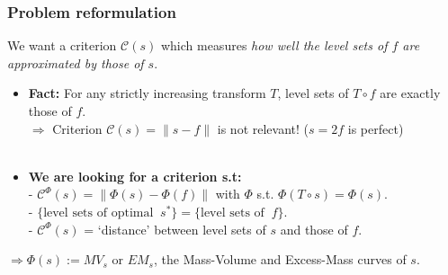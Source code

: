 \documentclass[10pt]{beamer}
\newcommand{\crit}{\mathcal{C}}
\def\leb{\text{Leb}}
\begin{document}
\begin{frame}
\frametitle{Problem reformulation}
We want a criterion $\mathcal{C}(s)$ which measures \emph{how well the level sets of $f$ are approximated by those of $s$}.
\begin{block}{}
\begin{itemize}
\item \textbf{Fact:} For any strictly increasing transform $T$, level sets of $T \circ f$ are exactly those of $f$.\\
$\Rightarrow$ Criterion $\mathcal{C}(s) = \|s-f\|$ is not relevant! ($s = 2f$ is perfect)\\~\\

\item \textbf{We are looking for a criterion s.t:}\\
- $\crit^{\Phi}(s) = \| \Phi(s) - \Phi(f) \|$ with $\Phi$ s.t. $\Phi(T \circ s) = \Phi(s)$. \\
- $ \{ \text{level sets of optimal }~ s^*\} = \{ \text{level sets of } ~f \}$. \\
- $\crit^{\Phi}(s)$ = `distance' between level sets of $s$ and those of $f$.

\end{itemize}
\end{block}
 $\Rightarrow \Phi(s) := MV_s$ or $EM_s$, the Mass-Volume and Excess-Mass curves of $s$.
\end{frame}
\end{document}
